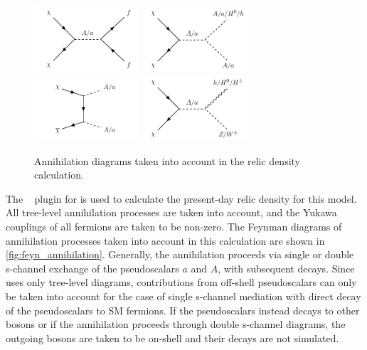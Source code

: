 \begin{figure}[h]
\centering
\includegraphics[width=0.35\textwidth]{texinputs/05_relic/figures/feynman/graph_2hdm_relic_s_fermions.pdf}
\includegraphics[width=0.35\textwidth]{texinputs/05_relic/figures/feynman/graph_2hdm_relic_s_bosons.pdf}
\includegraphics[width=0.35\textwidth]{texinputs/05_relic/figures/feynman/graph_2hdm_relic_ss_bosons.pdf}
\includegraphics[width=0.35\textwidth]{texinputs/05_relic/figures/feynman/graph_2hdm_relic_s_vbosons.pdf}

\caption{Annihilation diagrams taken into account in the relic density calculation.}
\label{fig:feyn_annihilation}
\end{figure}

The \maddm~\cite{Backovic:2013dpa,Backovic:2015cra} plugin for \mgamcnlo is used to calculate the present-day relic density for this model.
All tree-level annihilation processes are taken into account, and the Yukawa couplings of all fermions are taken to be non-zero.
The Feynman diagrams of annihilation processes taken into account in this calculation are shown in \autoref{fig:feyn_annihilation}. Generally, the annihilation proceeds via single or double s-channel exchange of the pseudoscalars $a$ and $A$, with subsequent decays. Since \maddm uses only tree-level diagrams, contributions from off-shell pseudoscalars can only be taken into account for the case of single s-channel mediation with direct decay of the pseudoscalars to SM fermions. If the pseudoscalars instead decays to other bosons or if the annihilation proceeds through double s-channel diagrams, the outgoing bosons are taken to be on-shell and their decays are not simulated. 

